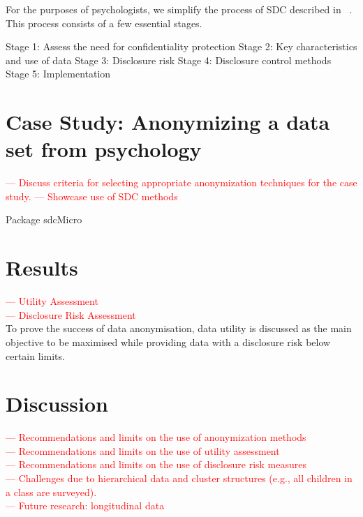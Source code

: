 \documentclass{article}
\begin{document}
For the purposes of psychologists, we simplify the process of SDC described in ~\cite{2012_Hundepool}.
This process consists of a few essential stages.

Stage 1: Assess the need for confidentiality protection
Stage 2: Key characteristics and use of data
Stage 3: Disclosure risk
Stage 4: Disclosure control methods
Stage 5: Implementation

\section{Case Study: Anonymizing a data set from psychology}

\textcolor{red}{— Discuss criteria for selecting appropriate anonymization techniques for the case study.}
\textcolor{red}{— Showcase use of SDC methods}

Package sdcMicro~\cite{2024_Sdcmicro}



\section{Results}

\textcolor{red}{— Utility Assessment} \\
\textcolor{red}{— Disclosure Risk Assessment} \\ 

To prove the success of data anonymisation, data utility is discussed as the main objective to be maximised while providing data with a disclosure risk below certain limits.

\section{Discussion}

\textcolor{red}{— Recommendations and limits on the use of anonymization methods} \\
\textcolor{red}{— Recommendations and limits on the use of utility assessment} \\
\textcolor{red}{— Recommendations and limits on the use of disclosure risk measures} \\
\textcolor{red}{— Challenges due to hierarchical data and cluster structures (e.g., all children in a class are surveyed).} \\
\textcolor{red}{— Future research: longitudinal data} \\
\end{document}
